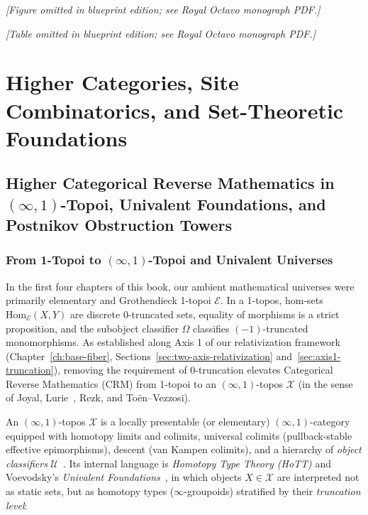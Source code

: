 \begin{center}\emph{[Figure omitted in blueprint edition; see Royal Octavo monograph PDF.]}\label{fig:exotic-r4-hub}\end{center}

\begin{center}\emph{[Table omitted in blueprint edition; see Royal Octavo monograph PDF.]}\label{tab:crm-borel-dictionary}\end{center}

\part{Higher Categories, Site Combinatorics, and Set-Theoretic Foundations}

\chapter{Higher Categorical Reverse Mathematics in $(\infty, 1)$-Topoi, Univalent Foundations, and Postnikov Obstruction Towers}

\label{ch:higher-crm}

\section{From 1-Topoi to $(\infty, 1)$-Topoi and Univalent Universes}\label{sec:higher-topoi-intro}

In the first four chapters of this book, our ambient mathematical universes were primarily elementary and Grothendieck 1-topoi $\mathcal{E}$. In a 1-topos, hom-sets $\mathrm{Hom}_{\mathcal{E}}(X, Y)$ are discrete $0$-truncated sets, equality of morphisms is a strict proposition, and the subobject classifier $\Omega$ classifies $(-1)$-truncated monomorphisms. As established along Axis 1 of our relativization framework (Chapter~\ref{ch:base-fiber}, Sections~\ref{sec:two-axis-relativization} and~\ref{sec:axis1-truncation}), removing the requirement of $0$-truncation elevates Categorical Reverse Mathematics ($\mathrm{CRM}$) from 1-topoi to an $(\infty, 1)$-topos $\mathcal{X}$ (in the sense of Joyal, Lurie~\cite{Lurie09}, Rezk, and To\"en--Vezzosi).

An $(\infty, 1)$-topos $\mathcal{X}$ is a locally presentable (or elementary) $(\infty, 1)$-category equipped with homotopy limits and colimits, universal colimits (pullback-stable effective epimorphisms), descent (van Kampen colimits), and a hierarchy of \emph{object classifiers} $\mathcal{U}$~\cite[\S 6.1.6]{Lurie09}. Its internal language is \emph{Homotopy Type Theory (HoTT)} and Voevodsky's \emph{Univalent Foundations}~\cite{HoTT13,GepnerKock17}, in which objects $X \in \mathcal{X}$ are interpreted not as static sets, but as homotopy types ($\infty$-groupoids) stratified by their \emph{truncation level}:

